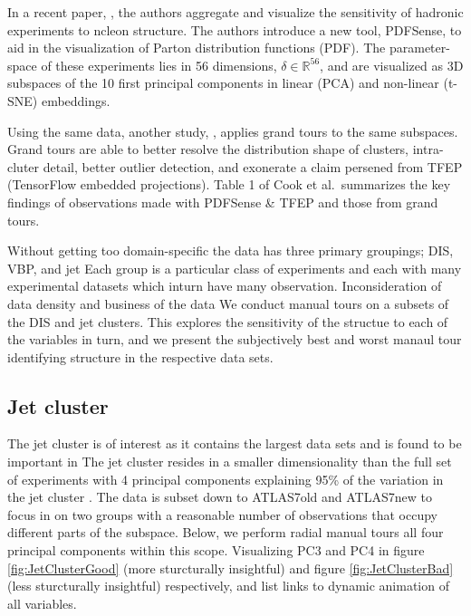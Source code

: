 \documentclass{monashthesis}
\begin{document}
In a recent paper, \textcite{wang_mapping_2018}, the authors aggregate and visualize the sensitivity of hadronic experiments to ncleon structure. The authors introduce a new tool, PDFSense, to aid in the visualization of Parton distribution functions (PDF). The parameter-space of these experiments lies in 56 dimensions, \(\delta \in \mathbb{R}^{56}\), and are visualized as 3D subspaces of the 10 first principal components in linear (PCA) and non-linear (t-SNE) embeddings.

Using the same data, another study, \textcite{cook_dynamical_2018}, applies grand tours to the same subspaces. Grand tours are able to better resolve the distribution shape of clusters, intra-cluter detail, better outlier detection, and exonerate a claim persened from TFEP (TensorFlow embedded projections). Table 1 of Cook et al.~summarizes the key findings of observations made with PDFSense \& TFEP and those from grand tours.

Without getting too domain-specific the data has three primary groupings; DIS, VBP, and jet Each group is a particular class of experiments and each with many experimental datasets which inturn have many observation. Inconsideration of data density and business of the data We conduct manual tours on a subsets of the DIS and jet clusters. This explores the sensitivity of the structue to each of the variables in turn, and we present the subjectively best and worst manaul tour identifying structure in the respective data sets.

\hypertarget{jet-cluster}{%
\subsection{Jet cluster}\label{jet-cluster}}

The jet cluster is of interest as it contains the largest data sets and is found to be important in \textcite{wang_mapping_2018} The jet cluster resides in a smaller dimensionality than the full set of experiments with 4 principal components explaining 95\% of the variation in the jet cluster \autocite{cook_dynamical_2018}. The data is subset down to ATLAS7old and ATLAS7new to focus in on two groups with a reasonable number of observations that occupy different parts of the subspace. Below, we perform radial manual tours all four principal components within this scope. Visualizing PC3 and PC4 in figure \ref{fig:JetClusterGood} (more sturcturally insightful) and figure \ref{fig:JetClusterBad} (less sturcturally insightful) respectively, and list links to dynamic animation of all variables.
\end{document}
